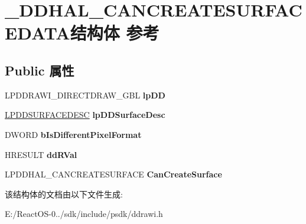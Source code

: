 \hypertarget{struct___d_d_h_a_l___c_a_n_c_r_e_a_t_e_s_u_r_f_a_c_e_d_a_t_a}{}\section{\+\_\+\+D\+D\+H\+A\+L\+\_\+\+C\+A\+N\+C\+R\+E\+A\+T\+E\+S\+U\+R\+F\+A\+C\+E\+D\+A\+T\+A结构体 参考}
\label{struct___d_d_h_a_l___c_a_n_c_r_e_a_t_e_s_u_r_f_a_c_e_d_a_t_a}
\subsection*{Public 属性}
\begin{DoxyCompactItemize}
\item 
\mbox{\label{struct___d_d_h_a_l___c_a_n_c_r_e_a_t_e_s_u_r_f_a_c_e_d_a_t_a_ab83a7911b102bf1c6ca431de417a828c}} 
L\+P\+D\+D\+R\+A\+W\+I\+\_\+\+D\+I\+R\+E\+C\+T\+D\+R\+A\+W\+\_\+\+G\+BL {\bfseries lp\+DD}
\item 
\mbox{\label{struct___d_d_h_a_l___c_a_n_c_r_e_a_t_e_s_u_r_f_a_c_e_d_a_t_a_adac90541479e121518e787b34a42cc47}} 
\hyperlink{interfacevoid}{L\+P\+D\+D\+S\+U\+R\+F\+A\+C\+E\+D\+E\+SC} {\bfseries lp\+D\+D\+Surface\+Desc}
\item 
\mbox{\label{struct___d_d_h_a_l___c_a_n_c_r_e_a_t_e_s_u_r_f_a_c_e_d_a_t_a_af3c4111772f8922d4f95f868bbe4c4c9}} 
D\+W\+O\+RD {\bfseries b\+Is\+Different\+Pixel\+Format}
\item 
\mbox{\label{struct___d_d_h_a_l___c_a_n_c_r_e_a_t_e_s_u_r_f_a_c_e_d_a_t_a_a00e3b25f86f8f400fb823eb738533c52}} 
H\+R\+E\+S\+U\+LT {\bfseries dd\+R\+Val}
\item 
\mbox{\label{struct___d_d_h_a_l___c_a_n_c_r_e_a_t_e_s_u_r_f_a_c_e_d_a_t_a_aecf94709a8b926e9f7ff295613014677}} 
L\+P\+D\+D\+H\+A\+L\+\_\+\+C\+A\+N\+C\+R\+E\+A\+T\+E\+S\+U\+R\+F\+A\+CE {\bfseries Can\+Create\+Surface}
\end{DoxyCompactItemize}


该结构体的文档由以下文件生成\+:\begin{DoxyCompactItemize}
\item 
E\+:/\+React\+O\+S-\/0../sdk/include/psdk/ddrawi.\+h\end{DoxyCompactItemize}
